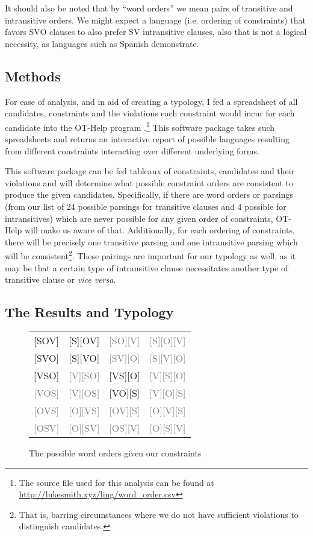 \documentclass{article}
\begin{document}
It should also be noted that by ``word orders'' we mean pairs of transitive and intransitive orders.
We might expect a language (i.e. ordering of constraints) that favors SVO clauses to also prefer SV intransitive clauses, also that is not a logical necessity, as languages such as Spanish demonstrate.

\subsection{Methods}

For ease of analysis, and in aid of creating a typology, I fed a spreadsheet of all candidates, constraints and the violations each constraint would incur for each candidate into the OT-Help program \parencite{othelp}.\footnote{The source file used for this analysis can be found at \href{http://lukesmith.xyz/ling/word_order.csv}{http://lukesmith.xyz/ling/word\_order.csv}} This software package takes such spreadsheets and returns an interactive report of possible languages resulting from different constraints interacting over different underlying forms.

This software package can be fed tableaux of constraints, candidates and their violations and will determine what possible constraint orders are consistent to produce the given candidates.
Specifically, if there are word orders or parsings (from our list of 24 possible parsings for transitive clauses and 4 possible for intransitives) which are never possible for any given order of constraints, OT-Help will make us aware of that.
Additionally, for each ordering of constraints, there will be precisely one transitive parsing and one intransitive parsing which will be consistent\footnote{That is, barring circumstances where we do not have sufficient violations to distinguish candidates.}.
These pairings are important for our typology as well, as it may be that a certain type of intransitive clause necessitates another type of transitive clause or \textit{vice versa}.

\subsection{The Results and Typology}

\newcommand{\no}{\textcolor{gray}}

\begin{figure}
	\begin{center}
	\begin{tabular}{cccc}
		{}[SOV]&[S][OV]&\no{[SO][V]}&\no{[S][O][V]}\\
		{}[SVO]&[S][VO]&\no{[SV][O]}&\no{[S][V][O]}\\
		{}[VSO]&\no{[V][SO]}&[VS][O]&\no{[V][S][O]}\\
		{}\no{[VOS]}&\no{[V][OS]}&[VO][S]&\no{[V][O][S]}\\
		{}\no{[OVS]}&\no{[O][VS]}&\no{[OV][S]}&\no{[O][V][S]}\\
		{}\no{[OSV]}&\no{[O][SV]}&\no{[OS][V]}&\no{[O][S][V]}\\
	\end{tabular}
	\end{center}
	\caption{The possible word orders given our constraints}
\end{figure}
\end{document}
